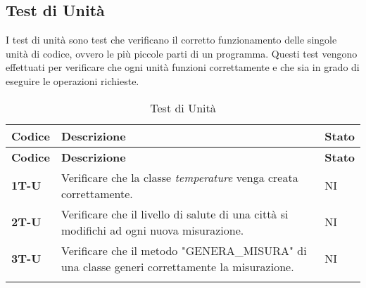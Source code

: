 \subsection{Test di Unità}
I test di unità sono test che verificano il corretto funzionamento delle singole unità di codice, ovvero le più piccole parti di un programma. Questi test vengono effettuati per verificare che ogni unità funzioni correttamente e che sia in grado di eseguire le operazioni richieste. \\
\begin{longtable}{|>{\raggedright\arraybackslash}m{}|>{\raggedright\arraybackslash}m{}|>{\raggedright\arraybackslash}m{}|}
	\hline
	\textbf{Codice} & \textbf{Descrizione}                                                                         & \textbf{Stato} \\
	\hline
	\endfirsthead
	\hline
	\textbf{Codice} & \textbf{Descrizione}                                                                         & \textbf{Stato} \\
	\endhead
	\textbf{1T-U}   & Verificare che la classe \textit{temperature} venga creata correttamente.                    & NI             \\
	\hline
	\textbf{2T-U}   & Verificare che il livello di salute di una città si modifichi ad ogni nuova misurazione.     & NI             \\
	\hline
	\textbf{3T-U}   & Verificare che il metodo "GENERA\_MISURA" di una classe generi correttamente la misurazione. & NI             \\
	\hline
	\caption{Test di Unità}
\end{longtable}

